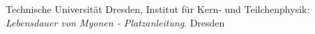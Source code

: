 \begin{thebibliography}{99}
 Technische Universität Dresden,  Institut für Kern- und Teilchenphysik: \textit{Lebensdauer von Myonen - Platzanleitung}. Dresden
\end{thebibliography}

